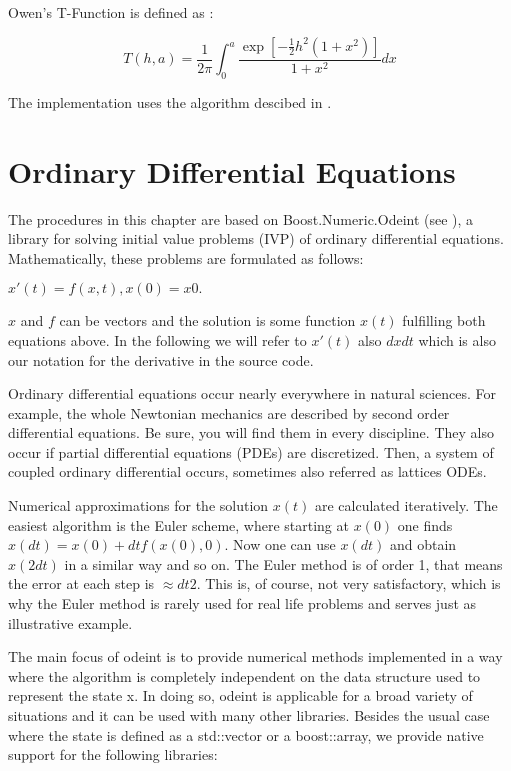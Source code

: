 \vspace{0.3cm}
Owen's T-Function is defined as \citep{owen_1956}:

\begin{equation}
	T(h,a) = \frac{1}{2\pi} \int_0^a \frac{\exp \left[-\tfrac{1}{2} h^2 (1+x^2)\right]}{1+x^2} dx
\end{equation}

The implementation uses the algorithm descibed in \cite{patefield_2000}.




\chapter{Ordinary Differential Equations}
\label{OrdinaryDifferentialEquations} 

The procedures in this chapter are based on Boost.Numeric.Odeint (see \cite{boost_odeint}), a library for solving initial value problems (IVP) of ordinary differential equations. Mathematically, these problems are formulated as follows: 

$x'(t) = f(x,t), x(0) = x0. $

$x$ and $f$ can be vectors and the solution is some function $x(t)$ fulfilling both equations above. In the following we will refer to $x'(t)$ also $dxdt$ which is also our notation for the derivative in the source code. 

Ordinary differential equations occur nearly everywhere in natural sciences. For example, the whole Newtonian mechanics are described by second order differential equations. Be sure, you will find them in every discipline. They also occur if partial differential equations (PDEs) are discretized. Then, a system of coupled ordinary differential occurs, sometimes also referred as lattices ODEs. 

Numerical approximations for the solution $x(t)$ are calculated iteratively. The easiest algorithm is the Euler scheme, where starting at $x(0)$ one finds $x(dt) = x(0) + dt f(x(0),0)$. Now one can use $x(dt)$ and obtain $x(2dt)$ in a similar way and so on. The Euler method is of order 1, that means the error at each step is $\approx dt2$. This is, of course, not very satisfactory, which is why the Euler method is rarely used for real life problems and serves just as illustrative example. 

The main focus of odeint is to provide numerical methods implemented in a way where the algorithm is completely independent on the data structure used to represent the state x. In doing so, odeint is applicable for a broad variety of situations and it can be used with many other libraries. Besides the usual case where the state is defined as a std::vector or a boost::array, we provide native support for the following libraries: 

